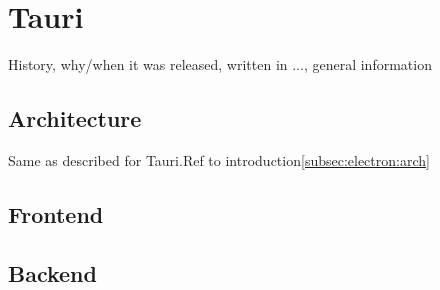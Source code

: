 \section{Tauri}
\label{sec:tauri}
History, why/when it was released, written in ..., general information

\subsection{Architecture}
\label{subsec:tauri:architecture}
Same as described for Tauri.Ref to introduction\ref{subsec:electron:arch}

\subsection{Frontend}
\label{subsec:tauri:frontend}

\subsection{Backend}
\label{subsec:tauri:backend}


